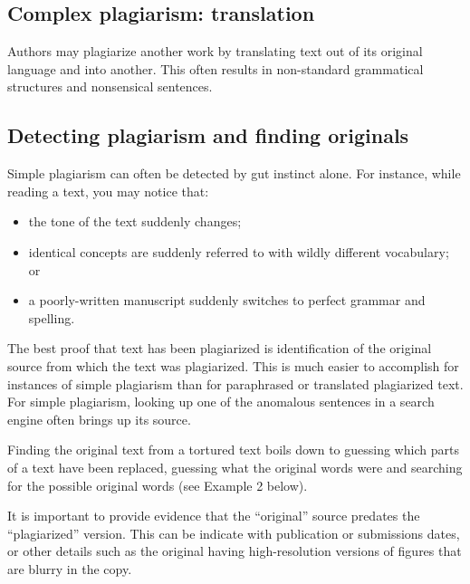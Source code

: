 \documentclass[letterpaper, 12pt]{article}
\begin{document}
\subsection*{Complex plagiarism: translation}

Authors may plagiarize another work by translating text out of its original language and into another. This often results in non-standard grammatical structures and nonsensical sentences.

\subsection*{Detecting plagiarism and finding originals}

Simple plagiarism can often be detected by gut instinct alone. For instance, while reading a text, you may notice that:

\begin{itemize}
    \setlength\itemsep{-0.5em}
    \item the tone of the text suddenly changes;
    \item identical concepts are suddenly referred to with wildly different vocabulary; or
    \item a poorly-written manuscript suddenly switches to perfect grammar and spelling.
\end{itemize}

The best proof that text has been plagiarized is identification of the original source from which the text was plagiarized. This is much easier to accomplish for instances of simple plagiarism than for paraphrased or translated plagiarized text. For simple plagiarism, looking up one of the anomalous sentences in a search engine often brings up its source.

Finding the original text from a tortured text boils down to guessing which parts of a text have been replaced, guessing what the original words were and searching for the possible original words (see Example 2 below).

It is important to provide evidence that the ``original'' source predates the ``plagiarized'' version.
This can be indicate with publication or submissions dates, or other details such as the original having high-resolution versions of figures that are blurry in the copy.
\end{document}
